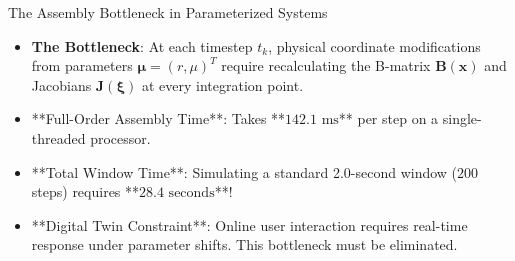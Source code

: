 \documentclass[aspectratio=169, 10pt]{beamer}
\newcommand{\mat}[1]{\mathbf{#1}}
\newcommand{\vect}[1]{\mathbf{#1}}
\begin{document}
\begin{frame}{The Assembly Bottleneck in Parameterized Systems}
    \begin{itemize}
        \item \textbf{The Bottleneck}: At each timestep $t_k$, physical coordinate modifications from parameters $\boldsymbol{\mu} = (r, \mu)^T$ require recalculating the B-matrix $\mat{B}(\vect{x})$ and Jacobians $\mat{J}(\boldsymbol{\xi})$ at every integration point.
        \item **Full-Order Assembly Time**: Takes **$142.1\text{ ms}$** per step on a single-threaded processor.
        \item **Total Window Time**: Simulating a standard 2.0-second window ($200$ steps) requires **$28.4\text{ seconds}$**!
        \item **Digital Twin Constraint**: Online user interaction requires real-time response under parameter shifts. This bottleneck must be eliminated.
    \end{itemize}
\end{frame}
\end{document}
